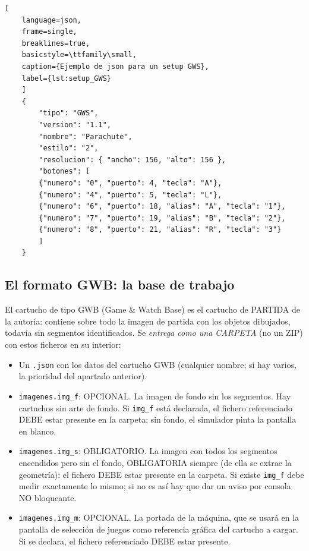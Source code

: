 \begin{lstlisting}[
	language=json, 
	frame=single, 
	breaklines=true, 
	basicstyle=\ttfamily\small,
	caption={Ejemplo de json para un setup GWS},
	label={lst:setup_GWS}
	]
	{
		"tipo": "GWS",
		"version": "1.1",
		"nombre": "Parachute",
		"estilo": "2",
		"resolucion": { "ancho": 156, "alto": 156 },
		"botones": [
		{"numero": "0", "puerto": 4, "tecla": "A"},
		{"numero": "4", "puerto": 5, "tecla": "L"},
		{"numero": "6", "puerto": 18, "alias": "A", "tecla": "1"},
		{"numero": "7", "puerto": 19, "alias": "B", "tecla": "2"},
		{"numero": "8", "puerto": 21, "alias": "R", "tecla": "3"}
		]
	}
\end{lstlisting}

\subsection*{El formato GWB: la base de trabajo}
\label{sec:F1A01GWB}

El cartucho de tipo GWB (Game \& Watch Base) es el cartucho de PARTIDA de la autoría: contiene sobre todo la imagen de partida con los objetos dibujados, todavía sin
segmentos identificados. Se \emph{entrega como una CARPETA} (no un ZIP) con estos ficheros en su interior:

\begin{itemize}
	\item Un \texttt{.json} con los datos del cartucho GWB (cualquier nombre; si hay
	varios, la prioridad del apartado anterior).
	
	\item \texttt{imagenes.img\_f}: OPCIONAL. La imagen de fondo sin los segmentos. Hay 
	cartuchos sin arte de fondo. Si \texttt{img\_f} está declarada, el 	fichero referenciado
	DEBE estar presente en la carpeta; sin fondo, el simulador pinta la pantalla en blanco.
	
	\item \texttt{imagenes.img\_s}: OBLIGATORIO. La imagen con todos los segmentos encendidos pero sin 
	el fondo, OBLIGATORIA siempre (de ella se extrae la geometría): el fichero DEBE estar presente en la carpeta. Si existe \texttt{img\_f}
	debe medir exactamente lo mismo; si no es así hay que dar un aviso por consola NO bloqueante.
	
	\item \texttt{imagenes.img\_m}: OPCIONAL. La portada de la máquina, que se usará en la
	pantalla de selección de juegos como referencia gráfica del cartucho a cargar. Si se declara, el fichero referenciado DEBE estar presente.
\end{itemize}

